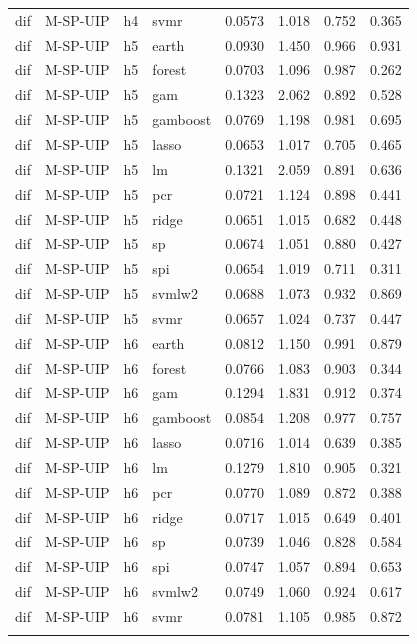 \begin{ThreePartTable}
\begin{longtable}[t]{llclcccc}
dif & M-SP-UIP & h4 & svmr & 0.0573 & 1.018 & 0.752 & 0.365\\
\addlinespace
dif & M-SP-UIP & h5 & earth & 0.0930 & 1.450 & 0.966 & 0.931\\
dif & M-SP-UIP & h5 & forest & 0.0703 & 1.096 & 0.987 & 0.262\\
dif & M-SP-UIP & h5 & gam & 0.1323 & 2.062 & 0.892 & 0.528\\
dif & M-SP-UIP & h5 & gamboost & 0.0769 & 1.198 & 0.981 & 0.695\\
dif & M-SP-UIP & h5 & lasso & 0.0653 & 1.017 & 0.705 & 0.465\\
dif & M-SP-UIP & h5 & lm & 0.1321 & 2.059 & 0.891 & 0.636\\
dif & M-SP-UIP & h5 & pcr & 0.0721 & 1.124 & 0.898 & 0.441\\
dif & M-SP-UIP & h5 & ridge & 0.0651 & 1.015 & 0.682 & 0.448\\
dif & M-SP-UIP & h5 & sp & 0.0674 & 1.051 & 0.880 & 0.427\\
dif & M-SP-UIP & h5 & spi & 0.0654 & 1.019 & 0.711 & 0.311\\
dif & M-SP-UIP & h5 & svmlw2 & 0.0688 & 1.073 & 0.932 & 0.869\\
dif & M-SP-UIP & h5 & svmr & 0.0657 & 1.024 & 0.737 & 0.447\\
\addlinespace
dif & M-SP-UIP & h6 & earth & 0.0812 & 1.150 & 0.991 & 0.879\\
dif & M-SP-UIP & h6 & forest & 0.0766 & 1.083 & 0.903 & 0.344\\
dif & M-SP-UIP & h6 & gam & 0.1294 & 1.831 & 0.912 & 0.374\\
dif & M-SP-UIP & h6 & gamboost & 0.0854 & 1.208 & 0.977 & 0.757\\
dif & M-SP-UIP & h6 & lasso & 0.0716 & 1.014 & 0.639 & 0.385\\
dif & M-SP-UIP & h6 & lm & 0.1279 & 1.810 & 0.905 & 0.321\\
dif & M-SP-UIP & h6 & pcr & 0.0770 & 1.089 & 0.872 & 0.388\\
dif & M-SP-UIP & h6 & ridge & 0.0717 & 1.015 & 0.649 & 0.401\\
dif & M-SP-UIP & h6 & sp & 0.0739 & 1.046 & 0.828 & 0.584\\
dif & M-SP-UIP & h6 & spi & 0.0747 & 1.057 & 0.894 & 0.653\\
dif & M-SP-UIP & h6 & svmlw2 & 0.0749 & 1.060 & 0.924 & 0.617\\
dif & M-SP-UIP & h6 & svmr & 0.0781 & 1.105 & 0.985 & 0.872\\
\addlinespace

\end{longtable}
\end{ThreePartTable}
